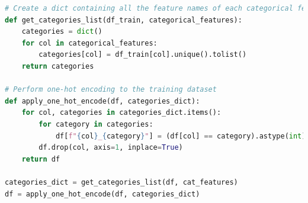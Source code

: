 \documentclass[10pt]{article}
\begin{document}
\begin{lstlisting}[language=Python, label={lst:one_hot_encoding}, caption={One-hot encode the categorical features}]
# Create a dict containing all the feature names of each categorical feature
def get_categories_list(df_train, categorical_features):
    categories = dict()
    for col in categorical_features:
        categories[col] = df_train[col].unique().tolist()
    return categories

# Perform one-hot encoding to the training dataset
def apply_one_hot_encode(df, categories_dict):
    for col, categories in categories_dict.items():
        for category in categories:
            df[f"{col}_{category}"] = (df[col] == category).astype(int)
        df.drop(col, axis=1, inplace=True)
    return df

categories_dict = get_categories_list(df, cat_features)
df = apply_one_hot_encode(df, categories_dict)
\end{lstlisting}
\end{document}
